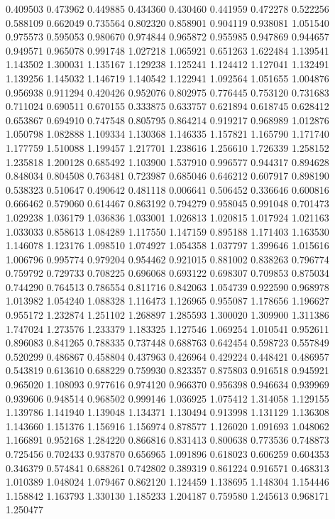 0.409503
0.473962
0.449885
0.434360
0.430460
0.441959
0.472278
0.522256
0.588109
0.662049
0.735564
0.802320
0.858901
0.904119
0.938081
1.051540
0.975573
0.595053
0.980670
0.974844
0.965872
0.955985
0.947869
0.944657
0.949571
0.965078
0.991748
1.027218
1.065921
0.651263
1.622484
1.139541
1.143502
1.300031
1.135167
1.129238
1.125241
1.124412
1.127041
1.132491
1.139256
1.145032
1.146719
1.140542
1.122941
1.092564
1.051655
1.004876
0.956938
0.911294
0.420426
0.952076
0.802975
0.776445
0.753120
0.731683
0.711024
0.690511
0.670155
0.333875
0.633757
0.621894
0.618745
0.628412
0.653867
0.694910
0.747548
0.805795
0.864214
0.919217
0.968989
1.012876
1.050798
1.082888
1.109334
1.130368
1.146335
1.157821
1.165790
1.171740
1.177759
1.510088
1.199457
1.217701
1.238616
1.256610
1.726339
1.258152
1.235818
1.200128
0.685492
1.103900
1.537910
0.996577
0.944317
0.894628
0.848034
0.804508
0.763481
0.723987
0.685046
0.646212
0.607917
0.898190
0.538323
0.510647
0.490642
0.481118
0.006641
0.506452
0.336646
0.600816
0.666462
0.579060
0.614467
0.863192
0.794279
0.958045
0.991048
0.701473
1.029238
1.036179
1.036836
1.033001
1.026813
1.020815
1.017924
1.021163
1.033033
0.858613
1.084289
1.117550
1.147159
0.895188
1.171403
1.163530
1.146078
1.123176
1.098510
1.074927
1.054358
1.037797
1.399646
1.015616
1.006796
0.995774
0.979204
0.954462
0.921015
0.881002
0.838263
0.796774
0.759792
0.729733
0.708225
0.696068
0.693122
0.698307
0.709853
0.875034
0.744290
0.764513
0.786554
0.811716
0.842063
1.054739
0.922590
0.968978
1.013982
1.054240
1.088328
1.116473
1.126965
0.955087
1.178656
1.196627
0.955172
1.232874
1.251102
1.268897
1.285593
1.300020
1.309900
1.311386
1.747024
1.273576
1.233379
1.183325
1.127546
1.069254
1.010541
0.952611
0.896083
0.841265
0.788335
0.737448
0.688763
0.642454
0.598723
0.557849
0.520299
0.486867
0.458804
0.437963
0.426964
0.429224
0.448421
0.486957
0.543819
0.613610
0.688229
0.759930
0.823357
0.875803
0.916518
0.945921
0.965020
1.108093
0.977616
0.974120
0.966370
0.956398
0.946634
0.939969
0.939606
0.948514
0.968502
0.999146
1.036925
1.075412
1.314058
1.129155
1.139786
1.141940
1.139048
1.134371
1.130494
0.913998
1.131129
1.136308
1.143660
1.151376
1.156916
1.156974
0.878577
1.126020
1.091693
1.048062
1.166891
0.952168
1.284220
0.866816
0.831413
0.800638
0.773536
0.748873
0.725456
0.702433
0.937870
0.656965
1.091896
0.618023
0.606259
0.604353
0.346379
0.574841
0.688261
0.742802
0.389319
0.861224
0.916571
0.468313
1.010389
1.048024
1.079467
0.862120
1.124459
1.138695
1.148304
1.154446
1.158842
1.163793
1.330130
1.185233
1.204187
0.759580
1.245613
0.968171
1.250477
